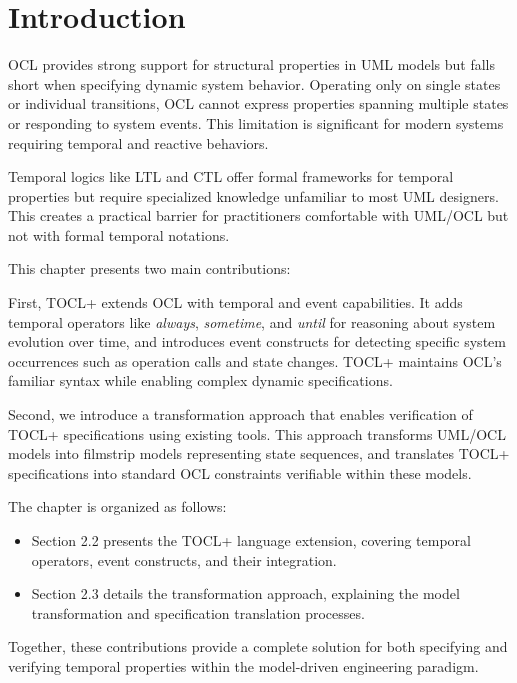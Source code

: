 \section{Introduction}

\hspace{1cm} OCL provides strong support for structural properties in UML models but 
falls short when specifying dynamic system behavior. Operating only on single states 
or individual transitions, OCL cannot express properties spanning multiple states or 
responding to system events. This limitation is significant for modern systems 
requiring temporal and reactive behaviors.

Temporal logics like LTL and CTL offer formal frameworks for temporal properties but 
require specialized knowledge unfamiliar to most UML designers. This creates a practical 
barrier for practitioners comfortable with UML/OCL but not with formal temporal notations.

This chapter presents two main contributions:

First, TOCL+ extends OCL with temporal and event capabilities. It adds temporal 
operators like \textit{always}, \textit{sometime}, and \textit{until} for reasoning 
about system evolution over time, and introduces event constructs for detecting 
specific system occurrences such as operation calls and state changes. TOCL+ maintains 
OCL's familiar syntax while enabling complex dynamic specifications.

Second, we introduce a transformation approach that enables verification of TOCL+ 
specifications using existing tools. This approach transforms UML/OCL models into 
filmstrip models representing state sequences, and translates TOCL+ specifications 
into standard OCL constraints verifiable within these models.

The chapter is organized as follows:
\begin{itemize}
    \item Section 2.2 presents the TOCL+ language extension, covering temporal 
    operators, event constructs, and their integration.
    
    \item Section 2.3 details the transformation approach, explaining the model 
    transformation and specification translation processes.
\end{itemize}

Together, these contributions provide a complete solution for both specifying and 
verifying temporal properties within the model-driven engineering paradigm.